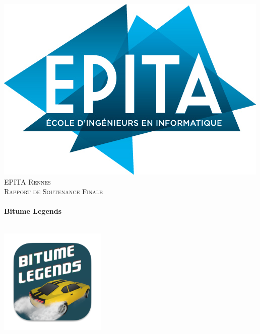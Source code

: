 \graphicspath{{../Medias}}

\begin{titlepage}
  \begin{sffamily}
  \begin{center}

  
    \includegraphics[scale=0.3]{epita.png}\\[1.5cm]

    \textsc{\huge EPITA Rennes}\\[0.5cm]

    \textsc{\Large Rapport de Soutenance Finale}\\[1.5cm]

    \HRule \\[0.4cm]
     { \LARGE \bfseries Bitume Legends \\[0.4cm] }

    \HRule \\[2cm]
    \includegraphics[scale=0.5]{logo192.png}
     \\[0.5cm]
    \textsc{\Large \CEX}\\[1.5cm]


\end{center}
\end{sffamily}
\end{titlepage}
